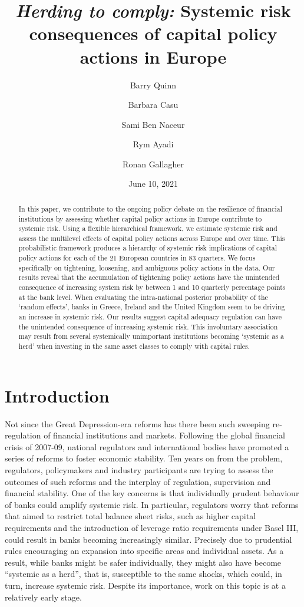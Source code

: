 \documentclass[
  10pt,
]{article}
\title{\emph{Herding to comply:} Systemic risk consequences of capital policy
actions in Europe}
\author{Barry Quinn \and Barbara Casu \and Sami Ben Naceur \and Rym Ayadi \and Ronan Gallagher}
\date{June 10, 2021}
\begin{document}
\maketitle
\begin{abstract}
In this paper, we contribute to the ongoing policy debate on the
resilience of financial institutions by assessing whether capital policy
actions in Europe contribute to systemic risk. Using a flexible
hierarchical framework, we estimate systemic risk and assess the
multilevel effects of capital policy actions across Europe and over
time. This probabilistic framework produces a hierarchy of systemic risk
implications of capital policy actions for each of the 21 European
countries in 83 quarters. We focus specifically on tightening,
loosening, and ambiguous policy actions in the data. Our results reveal
that the accumulation of tightening policy actions have the unintended
consequence of increasing system risk by between 1 and 10 quarterly
percentage points at the bank level. When evaluating the intra-national
posterior probability of the `random effects', banks in Greece, Ireland
and the United Kingdom seem to be driving an increase in systemic risk.
Our results suggest capital adequacy regulation can have the unintended
consequence of increasing systemic risk. This involuntary association
may result from several systemically unimportant institutions becoming
`systemic as a herd' when investing in the same asset classes to comply
with capital rules.
\end{abstract}

\hypertarget{introduction}{%
\section{Introduction}\label{introduction}}

Not since the Great Depression-era reforms has there been such sweeping
re-regulation of financial institutions and markets. Following the
global financial crisis of 2007-09, national regulators and
international bodies have promoted a series of reforms to foster
economic stability. Ten years on from the problem, regulators,
policymakers and industry participants are trying to assess the outcomes
of such reforms and the interplay of regulation, supervision and
financial stability. One of the key concerns is that individually
prudent behaviour of banks could amplify systemic risk. In particular,
regulators worry that reforms that aimed to restrict total balance sheet
risks, such as higher capital requirements and the introduction of
leverage ratio requirements under Basel III, could result in banks
becoming increasingly similar. Precisely due to prudential rules
encouraging an expansion into specific areas and individual assets. As a
result, while banks might be safer individually, they might also have
become ``systemic as a herd'', that is, susceptible to the same shocks,
which could, in turn, increase systemic risk. Despite its importance,
work on this topic is at a relatively early stage.
\end{document}
